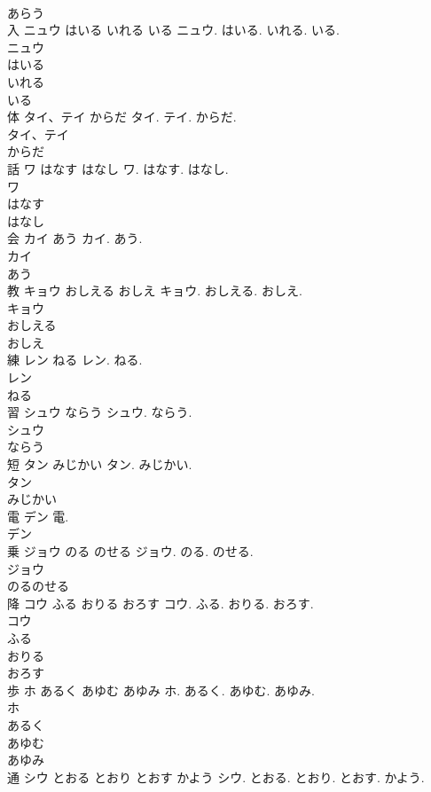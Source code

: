 \documentclass[8pt]{extreport}
\begin{document}
\begin{CJK}{UTF8}{min}
\\	あらう
\\	入	ニュウ はいる いれる いる	ニュウ. はいる. いれる. いる.	
\\	ニュウ
\\	はいる
\\	いれる
\\	いる
\\	体	タイ、テイ からだ	タイ. テイ. からだ.	
\\	タイ、テイ
\\	からだ
\\	話	ワ はなす はなし	ワ. はなす. はなし.	
\\	ワ
\\	はなす
\\	はなし
\\	会	カイ あう	カイ. あう.	
\\	カイ
\\	あう
\\	教	キョウ おしえる おしえ	キョウ. おしえる. おしえ.	
\\	キョウ
\\	おしえる
\\	おしえ
\\	練	レン ねる	レン. ねる.	
\\	レン
\\	ねる
\\	習	シュウ ならう	シュウ. ならう.	
\\	シュウ
\\	ならう
\\	短	タン みじかい	タン. みじかい.	
\\	タン
\\	みじかい
\\	電	デン	電.	
\\	デン
\\	乗	ジョウ のる のせる	ジョウ. のる. のせる.	
\\	ジョウ
\\	のるのせる
\\	降	コウ ふる おりる おろす	コウ. ふる. おりる. おろす.	
\\	コウ
\\	ふる
\\	おりる
\\	おろす
\\	歩	ホ あるく あゆむ あゆみ	ホ. あるく. あゆむ. あゆみ.	
\\	ホ
\\	あるく
\\	あゆむ
\\	あゆみ
\\	通	シウ とおる とおり とおす かよう	シウ. とおる. とおり. とおす. かよう.	

\end{CJK}
\end{document}
